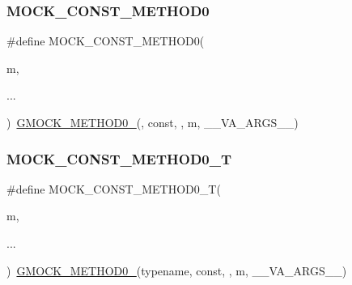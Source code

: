 \mbox{\label{_obj__test_2lib_2googletest-release-1_88_81_2googlemock_2include_2gmock_2gmock-generated-function-mockers_8h_ac86e04e649fa8bf35b5f0149a13c935d}} 
\subsubsection{\texorpdfstring{MOCK\_CONST\_METHOD0}{MOCK\_CONST\_METHOD0}}
{\footnotesize\ttfamily \#define M\+O\+C\+K\+\_\+\+C\+O\+N\+S\+T\+\_\+\+M\+E\+T\+H\+O\+D0(\begin{DoxyParamCaption}\item[{}]{m,  }\item[{}]{... }\end{DoxyParamCaption})~\mbox{\hyperlink{_obj__test_2lib_2googletest-release-1_88_81_2googlemock_2include_2gmock_2gmock-generated-function-mockers_8h_ae0d290ffa58d7c624b2e3487ba1252f4}{G\+M\+O\+C\+K\+\_\+\+M\+E\+T\+H\+O\+D0\+\_\+}}(, const, , m, \+\_\+\+\_\+\+V\+A\+\_\+\+A\+R\+G\+S\+\_\+\+\_\+)}

\mbox{\label{_obj__test_2lib_2googletest-release-1_88_81_2googlemock_2include_2gmock_2gmock-generated-function-mockers_8h_a5fc82f3de9d5e83b0a6bb6cda98a8887}} 
\subsubsection{\texorpdfstring{MOCK\_CONST\_METHOD0\_T}{MOCK\_CONST\_METHOD0\_T}}
{\footnotesize\ttfamily \#define M\+O\+C\+K\+\_\+\+C\+O\+N\+S\+T\+\_\+\+M\+E\+T\+H\+O\+D0\+\_\+T(\begin{DoxyParamCaption}\item[{}]{m,  }\item[{}]{... }\end{DoxyParamCaption})~\mbox{\hyperlink{_obj__test_2lib_2googletest-release-1_88_81_2googlemock_2include_2gmock_2gmock-generated-function-mockers_8h_ae0d290ffa58d7c624b2e3487ba1252f4}{G\+M\+O\+C\+K\+\_\+\+M\+E\+T\+H\+O\+D0\+\_\+}}(typename, const, , m, \+\_\+\+\_\+\+V\+A\+\_\+\+A\+R\+G\+S\+\_\+\+\_\+)}

